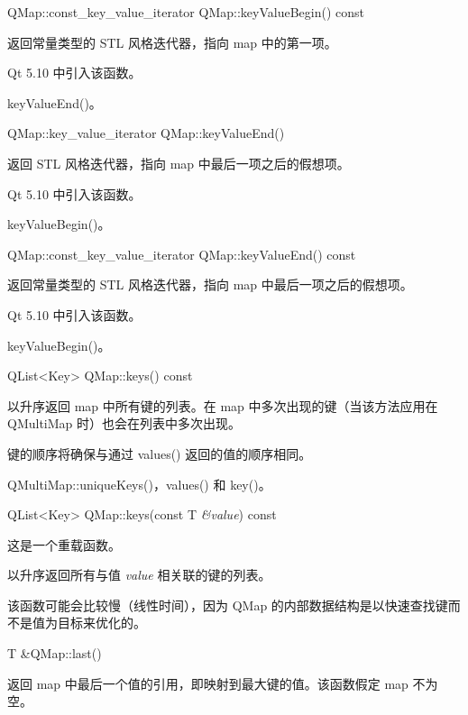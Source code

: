 QMap::const\_key\_value\_iterator QMap::keyValueBegin() const

返回常量类型的 STL 风格迭代器，指向 map 中的第一项。

Qt 5.10 中引入该函数。

\begin{seeAlso}
keyValueEnd()。
\end{seeAlso}

\splitLine

QMap::key\_value\_iterator QMap::keyValueEnd()

返回 STL 风格迭代器，指向 map 中最后一项之后的假想项。

Qt 5.10 中引入该函数。

\begin{seeAlso}
keyValueBegin()。
\end{seeAlso}

\splitLine

QMap::const\_key\_value\_iterator QMap::keyValueEnd() const

返回常量类型的 STL 风格迭代器，指向 map 中最后一项之后的假想项。

Qt 5.10 中引入该函数。

\begin{seeAlso}
keyValueBegin()。
\end{seeAlso}

\splitLine

QList<Key> QMap::keys() const

以升序返回 map 中所有键的列表。在 map 中多次出现的键（当该方法应用在 QMultiMap 时）也会在列表中多次出现。

键的顺序将确保与通过 values() 返回的值的顺序相同。

\begin{seeAlso}
QMultiMap::uniqueKeys()，values() 和 key()。
\end{seeAlso}

\splitLine

QList<Key> QMap::keys(const T \emph{\&value}) const

这是一个重载函数。

以升序返回所有与值 \emph{value} 相关联的键的列表。

该函数可能会比较慢（线性时间），因为 QMap 的内部数据结构是以快速查找键而不是值为目标来优化的。

\splitLine

T \&QMap::last()

返回 map 中最后一个值的引用，即映射到最大键的值。该函数假定 map 不为空。


